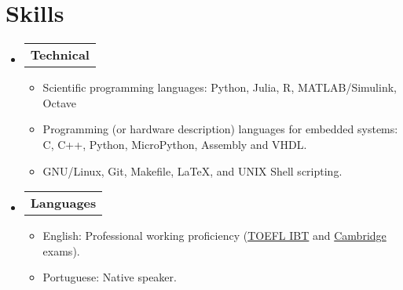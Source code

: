 \section{Skills}

\begin{itemize}[leftmargin=0.15in, label={}] %
  \item   \begin{tabular*}{0.2\textwidth}{l} \textbf{Technical} \end{tabular*}\vspace{-7pt} %
          \begin{itemize} %
            \item Scientific programming languages: Python, Julia, R, MATLAB/Simulink, Octave
            \item Programming (or hardware description) languages for embedded systems: C, C++, Python, MicroPython, Assembly and VHDL. %
            \item GNU/Linux, Git, Makefile, \LaTeX, and UNIX Shell scripting.
          \end{itemize}\vspace{-5pt}
  \item   \begin{tabular*}{0.2\textwidth}{l} \textbf{Languages} \end{tabular*}\vspace{-6pt} %
          \begin{itemize}
            \item English: Professional working proficiency (\href{https://github.com/tapyu/tapyu/blob/master/cv/Latex/figs/Toefl.pdf}{TOEFL IBT} and \href{https://github.com/tapyu/tapyu/blob/master/cv/Latex/figs/Cambridge\%20FCE.pdf}{Cambridge} exams).
            \item Portuguese: Native speaker.
          \end{itemize}
\end{itemize} %